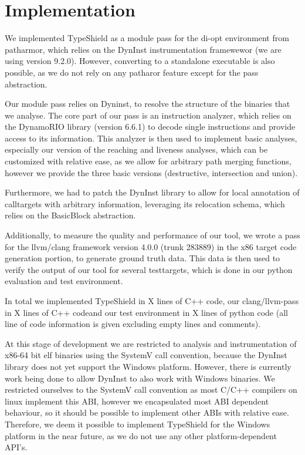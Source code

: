 \chapter{Implementation}
\label{chapter:Implementation}

We implemented TypeShield as a module pass for the di-opt environment from patharmor\cite{patharmor}, which relies on the DynInst \cite{bernat:dyninst} instrumentation framewewor (we are using version 9.2.0). However, converting to a standalone executable is also possible, as we do not rely on any patharor feature except for the pass abstraction.

Our module pass relies on Dyninst, to resolve the structure of the binaries that we analyse. The core part of our pass is an instruction analyzer, which relies on the DynamoRIO \cite{dynamorio:drmemory} library (version 6.6.1) to decode single instructions and provide access to its information. This analyzer is then used to implement basic analyses, especially our version of the reaching and liveness analyses, which can be customized with relative ease, as we allow for arbitrary path merging functions, however we provide the three basic versions (destructive, intersection and union).

Furthermore, we had to patch the DynInst library to allow for local annotation of calltargets with arbitrary information, leveraging its relocation schema, which relies on the BasicBlock abstraction.

Additionally, to measure the quality and performance of our tool, we wrote a pass for the llvm/clang \cite{clang} framework version 4.0.0 (trunk 283889) in the x86 target code generation portion, to generate ground truth data. This data is then used to verify the output of our tool for several testtargets, which is done in our python evaluation and test environment.

In total we implemented TypeShield in X lines of C++ code, our clang/llvm-pass in X lines of C++ codeand our test environment in X lines of python code (all line of code information is given excluding empty lines and comments).

At this stage of development we are restricted to analysis and instrumentation of x86-64 bit elf binaries using the SystemV call convention, because the DynInst library does not yet support the Windows platform. However, there is currently work being done to allow DynInst to also work with Windows binaries. We restricted ourselves to the SystemV call convention as most C/C++ compilers on linux implement this ABI, however we encapsulated most ABI dependent behaviour, so it should be possible to implement other ABIs with relative ease. Therefore, we deem it possible to implement TypeShield for the Windows platform in the near future, as we do not use any other platform-dependent API's. 


